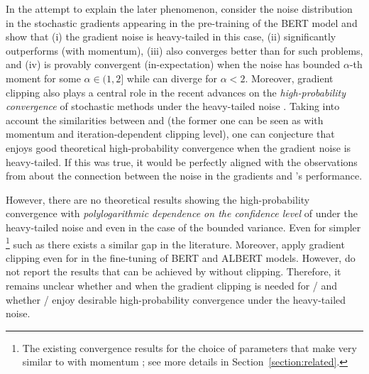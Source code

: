 \documentclass{article}
\begin{document}
In the attempt to explain the later phenomenon, \citet{zhang2020adaptive} consider the noise distribution in the stochastic gradients appearing in the pre-training of the BERT model \citep{devlin2019bert} 
and show that (i) the gradient noise is heavy-tailed in this case, (ii)  significantly outperforms  (with momentum), (iii)  \citep{pascanu2013difficulty} also converges better than  for such problems, and (iv)  is provably convergent (in-expectation) when the noise has bounded $\alpha$-th moment for some $\alpha \in (1,2]$ while  can diverge for $\alpha < 2$. Moreover, gradient clipping also plays a central role in the recent advances on the \emph{high-probability convergence} of stochastic methods under the heavy-tailed noise \citep{gorbunov2020stochastic, cutkosky2021high, sadiev2023high, nguyen2023improved}. Taking into account the similarities between  and  (the former one can be seen as  with momentum and iteration-dependent clipping level), one can conjecture that  enjoys good theoretical high-probability convergence when the gradient noise is heavy-tailed. 
If this was true, it would be perfectly aligned with the observations from \citep{zhang2020adaptive} about the connection between the noise in the gradients and 's performance.

However, there are no theoretical results showing the high-probability convergence with \emph{polylogarithmic dependence on the confidence level} of  under the heavy-tailed noise and even in the case of the bounded variance. Even for simpler \footnote{The existing convergence results for   the choice of parameters that make  very similar to  with momentum \citep{defossez2022simple}; see more details in Section~\ref{section:related}.} such as  there exists a similar gap in the literature. Moreover, \citet{mosbach2020stability} apply gradient clipping even for  in the fine-tuning of BERT and ALBERT \citep{lan2019albert}  models. However, \citet{mosbach2020stability} do not report the results that can be achieved by  without clipping. Therefore, it remains unclear whether and when the gradient clipping is needed for / and whether / enjoy desirable high-probability convergence under the heavy-tailed noise.
\end{document}
